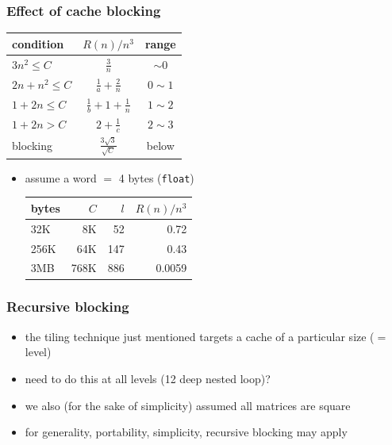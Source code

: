 \documentclass[12pt,dvipdfmx]{beamer}
\newcommand{\ao}[1]{{\color{blue}#1}}
\begin{document}
\begin{frame}[fragile]
\frametitle{Effect of cache blocking}

\begin{center}
\begin{tabular}{|l|c|c|}\hline
condition         & $R(n)/n^3$                      & range      \\\hline
$3n^2 \leq C$     & ${\displaystyle\frac{3}{n}}$    & $\sim 0$   \\\hline
$2n + n^2 \leq C$ & ${\displaystyle\frac{1}{a} + \frac{2}{n}}$     & $0 \sim 1$ \\\hline
$1 + 2n \leq C$   & ${\displaystyle\frac{1}{b} + 1 + \frac{1}{n}}$ & $1 \sim 2$ \\ \hline
$1 + 2n > C$      & ${\displaystyle2 + \frac{1}{c}}$               & $2 \sim 3$ \\\hline
blocking          & \ao{${\displaystyle\frac{3\sqrt{3}}{\sqrt{C}}}$} & below \\\hline
\end{tabular}
\end{center}

\begin{itemize}
\item assume a word $=$ 4 bytes ({\tt float})
\begin{center}
  \begin{tabular}{|l|r|r|r|}\hline
bytes & $C$ & $l$ & $R(n)/n^3$ \\\hline
32K   & 8K  & 52  & \ao{0.72}  \\
256K  & 64K & 147 & \ao{0.43}  \\
3MB   & 768K & 886 & \ao{0.0059} \\\hline
\end{tabular}
\end{center}
\end{itemize}
\end{frame}

\begin{frame}
\frametitle{Recursive blocking}
\begin{itemize}
\item the tiling technique just mentioned targets a cache
  of a particular size ($=$ level)
\item need to do this at all levels (12 deep nested loop)?
\item we also (for the sake of simplicity) assumed all matrices are square
\item for generality, portability, simplicity, \ao{recursive blocking} may apply
\end{itemize}

\end{frame}
\end{document}
